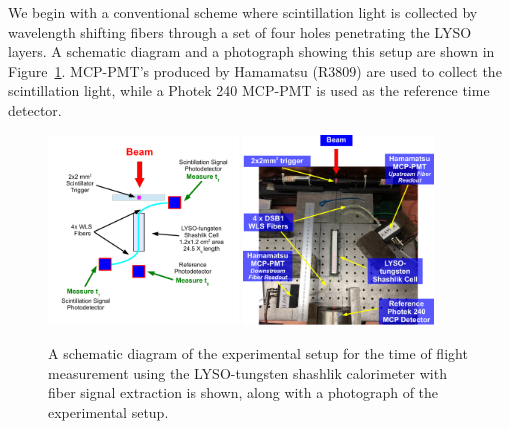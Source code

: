 \documentclass[12pt]{article}
\begin{document}
We begin with a conventional scheme where scintillation light is collected
by wavelength shifting fibers through a set of four holes penetrating 
the LYSO layers. A schematic diagram and a photograph showing this setup 
are shown in Figure~\ref{fig:ShashlikFiberSetup}. 
MCP-PMT's produced by Hamamatsu (R3809) are used to collect 
the scintillation light, while a Photek 240 MCP-PMT is used as the reference 
time detector. 


\begin{figure}[H] \centering
\includegraphics[width=0.45\textwidth]{figs/ShashlikFiberSetupSchematic} 
\includegraphics[width=0.45\textwidth]{figs/ShashlikFiberSetupPhoto} 
\caption{ A schematic diagram of the experimental setup for the
time of flight measurement using the LYSO-tungsten shashlik calorimeter
with fiber signal extraction is shown, along with a photograph of the
experimental setup. } 
\label{fig:ShashlikFiberSetup}
\end{figure}
\end{document}
